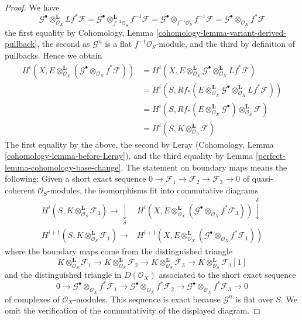 \begin{proof}

We have
$$
\mathcal{G}^\bullet \otimes_{\mathcal{O}_X}^\mathbf{L} Lf^*\mathcal{F} =
\mathcal{G}^\bullet \otimes_{f^{-1}\mathcal{O}_S}^\mathbf{L} f^{-1}\mathcal{F} =
\mathcal{G}^\bullet \otimes_{f^{-1}\mathcal{O}_S} f^{-1}\mathcal{F} =
\mathcal{G}^\bullet \otimes_{\mathcal{O}_X} f^*\mathcal{F}
$$
the first equality by
Cohomology, Lemma \ref{cohomology-lemma-variant-derived-pullback},
the second as $\mathcal{G}^n$ is a flat $f^{-1}\mathcal{O}_S$-module, and
the third by definition of pullbacks. Hence we obtain
\begin{align*}
H^i(X, E \otimes^\mathbf{L}_{\mathcal{O}_X}
(\mathcal{G}^\bullet \otimes_{\mathcal{O}_X} f^*\mathcal{F}))
& =
H^i(X, E \otimes^\mathbf{L}_{\mathcal{O}_X} \mathcal{G}^\bullet
\otimes_{\mathcal{O}_X}^\mathbf{L} Lf^*\mathcal{F}) \\
& =
H^i(S,
Rf_*(E \otimes^\mathbf{L}_{\mathcal{O}_X} \mathcal{G}^\bullet
\otimes^\mathbf{L}_{\mathcal{O}_X} Lf^*\mathcal{F})) \\
& =
H^i(S, Rf_*(E \otimes^\mathbf{L}_{\mathcal{O}_X} \mathcal{G}^\bullet)
\otimes^\mathbf{L}_{\mathcal{O}_S} \mathcal{F}) \\
& =
H^i(S, K \otimes^\mathbf{L}_{\mathcal{O}_S} \mathcal{F})
\end{align*}
The first equality by the above, the second by Leray
(Cohomology, Lemma \ref{cohomology-lemma-before-Leray}), and
the third equality by Lemma \ref{perfect-lemma-cohomology-base-change}.
The statement on boundary maps means the following: Given a short
exact sequence $0 \to \mathcal{F}_1 \to \mathcal{F}_2 \to \mathcal{F}_3 \to 0$
of quasi-coherent $\mathcal{O}_S$-modules, the isomorphisms fit into
commutative diagrams
$$
\begin{array}{cc}H^i(S, K \otimes^\mathbf{L}_{\mathcal{O}_S} \mathcal{F}_3)
\longrightarrow\underset{\delta}{\downarrow} & H^i(X, E \otimes^\mathbf{L}_{\mathcal{O}_X}
(\mathcal{G}^\bullet \otimes_{\mathcal{O}_X} f^*\mathcal{F}_3))
\overset{\delta}{\downarrow} \\ H^{i + 1}(S, K \otimes^\mathbf{L}_{\mathcal{O}_S} \mathcal{F}_1)
\longrightarrow & H^{i + 1}(X, E \otimes^\mathbf{L}_{\mathcal{O}_X}
(\mathcal{G}^\bullet \otimes_{\mathcal{O}_X} f^*\mathcal{F}_1))\end{array}
$$
where the boundary maps come from the distinguished triangle
$$
K \otimes^\mathbf{L}_{\mathcal{O}_S} \mathcal{F}_1 \to
K \otimes^\mathbf{L}_{\mathcal{O}_S} \mathcal{F}_2 \to
K \otimes^\mathbf{L}_{\mathcal{O}_S} \mathcal{F}_3 \to
K \otimes^\mathbf{L}_{\mathcal{O}_S} \mathcal{F}_1[1]
$$
and the distinguished triangle in $D(\mathcal{O}_X)$ associated to
the short exact sequence
$$
0 \to
\mathcal{G}^\bullet \otimes_{\mathcal{O}_X} f^*\mathcal{F}_1 \to
\mathcal{G}^\bullet \otimes_{\mathcal{O}_X} f^*\mathcal{F}_2 \to
\mathcal{G}^\bullet \otimes_{\mathcal{O}_X} f^*\mathcal{F}_3 \to 0
$$
of complexes of $\mathcal{O}_X$-modules.
This sequence is exact because $\mathcal{G}^n$ is flat over $S$.
We omit the verification of the commutativity of the displayed diagram.
\end{proof}

